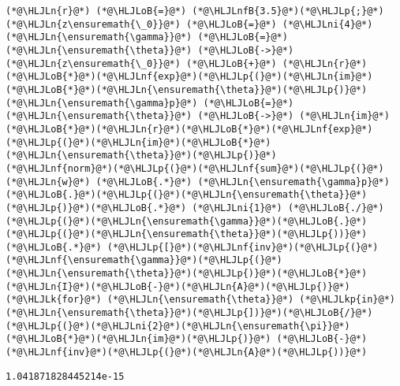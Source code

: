 \documentclass[12pt,landscape]{article}
\newcommand{\HLJLk}[1]{\textcolor[RGB]{148,91,176}{\textbf{#1}}}
\newcommand{\HLJLkp}[1]{\textcolor[RGB]{148,91,176}{\textbf{#1}}}
\newcommand{\HLJLn}[1]{#1}
\newcommand{\HLJLnf}[1]{\textcolor[RGB]{66,102,213}{#1}}
\newcommand{\HLJLnfB}[1]{\textcolor[RGB]{59,151,46}{#1}}
\newcommand{\HLJLni}[1]{\textcolor[RGB]{59,151,46}{#1}}
\newcommand{\HLJLoB}[1]{\textcolor[RGB]{102,102,102}{\textbf{#1}}}
\newcommand{\HLJLp}[1]{#1}
\begin{document}
{\begin{lstlisting}
(*@\HLJLn{r}@*) (*@\HLJLoB{=}@*) (*@\HLJLnfB{3.5}@*)(*@\HLJLp{;}@*) (*@\HLJLn{z\ensuremath{\_0}}@*) (*@\HLJLoB{=}@*) (*@\HLJLni{4}@*)
(*@\HLJLn{\ensuremath{\gamma}}@*) (*@\HLJLoB{=}@*) (*@\HLJLn{\ensuremath{\theta}}@*) (*@\HLJLoB{->}@*) (*@\HLJLn{z\ensuremath{\_0}}@*) (*@\HLJLoB{+}@*) (*@\HLJLn{r}@*)(*@\HLJLoB{*}@*)(*@\HLJLnf{exp}@*)(*@\HLJLp{(}@*)(*@\HLJLn{im}@*)(*@\HLJLoB{*}@*)(*@\HLJLn{\ensuremath{\theta}}@*)(*@\HLJLp{)}@*)
(*@\HLJLn{\ensuremath{\gamma}p}@*) (*@\HLJLoB{=}@*) (*@\HLJLn{\ensuremath{\theta}}@*) (*@\HLJLoB{->}@*) (*@\HLJLn{im}@*)(*@\HLJLoB{*}@*)(*@\HLJLn{r}@*)(*@\HLJLoB{*}@*)(*@\HLJLnf{exp}@*)(*@\HLJLp{(}@*)(*@\HLJLn{im}@*)(*@\HLJLoB{*}@*)(*@\HLJLn{\ensuremath{\theta}}@*)(*@\HLJLp{)}@*)
(*@\HLJLnf{norm}@*)(*@\HLJLp{(}@*)(*@\HLJLnf{sum}@*)(*@\HLJLp{(}@*)(*@\HLJLn{w}@*) (*@\HLJLoB{.*}@*) (*@\HLJLn{\ensuremath{\gamma}p}@*)(*@\HLJLoB{.}@*)(*@\HLJLp{(}@*)(*@\HLJLn{\ensuremath{\theta}}@*)(*@\HLJLp{)}@*)(*@\HLJLoB{.*}@*) (*@\HLJLni{1}@*) (*@\HLJLoB{./}@*)(*@\HLJLp{(}@*)(*@\HLJLn{\ensuremath{\gamma}}@*)(*@\HLJLoB{.}@*)(*@\HLJLp{(}@*)(*@\HLJLn{\ensuremath{\theta}}@*)(*@\HLJLp{))}@*) (*@\HLJLoB{.*}@*) (*@\HLJLp{[}@*)(*@\HLJLnf{inv}@*)(*@\HLJLp{(}@*)(*@\HLJLnf{\ensuremath{\gamma}}@*)(*@\HLJLp{(}@*)(*@\HLJLn{\ensuremath{\theta}}@*)(*@\HLJLp{)}@*)(*@\HLJLoB{*}@*)(*@\HLJLn{I}@*)(*@\HLJLoB{-}@*)(*@\HLJLn{A}@*)(*@\HLJLp{)}@*) (*@\HLJLk{for}@*) (*@\HLJLn{\ensuremath{\theta}}@*) (*@\HLJLkp{in}@*) (*@\HLJLn{\ensuremath{\theta}}@*)(*@\HLJLp{])}@*)(*@\HLJLoB{/}@*)(*@\HLJLp{(}@*)(*@\HLJLni{2}@*)(*@\HLJLn{\ensuremath{\pi}}@*)(*@\HLJLoB{*}@*)(*@\HLJLn{im}@*)(*@\HLJLp{)}@*) (*@\HLJLoB{-}@*) (*@\HLJLnf{inv}@*)(*@\HLJLp{(}@*)(*@\HLJLn{A}@*)(*@\HLJLp{))}@*)
\end{lstlisting}

\begin{lstlisting}
1.041871828445214e-15
\end{lstlisting}


}
\end{document}
